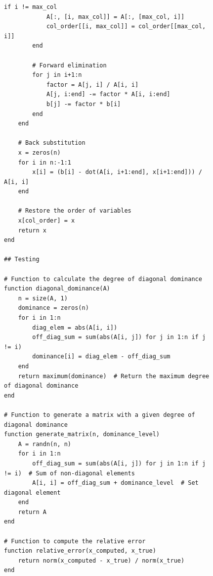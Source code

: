 \documentclass[a4paper, 14pt]{extarticle}
\begin{document}
\begin{figure}[!htb]
\begin{lstlisting}[caption={Реализация и сравнение разных вариаций метода Гаусса},label={lst:code3}]
        if i != max_col
            A[:, [i, max_col]] = A[:, [max_col, i]]
            col_order[[i, max_col]] = col_order[[max_col, i]]
        end

        # Forward elimination
        for j in i+1:n
            factor = A[j, i] / A[i, i]
            A[j, i:end] -= factor * A[i, i:end]
            b[j] -= factor * b[i]
        end
    end

    # Back substitution
    x = zeros(n)
    for i in n:-1:1
        x[i] = (b[i] - dot(A[i, i+1:end], x[i+1:end])) / A[i, i]
    end

    # Restore the order of variables
    x[col_order] = x
    return x
end

## Testing

# Function to calculate the degree of diagonal dominance
function diagonal_dominance(A)
    n = size(A, 1)
    dominance = zeros(n)
    for i in 1:n
        diag_elem = abs(A[i, i])
        off_diag_sum = sum(abs(A[i, j]) for j in 1:n if j != i)
        dominance[i] = diag_elem - off_diag_sum
    end
    return maximum(dominance)  # Return the maximum degree of diagonal dominance
end

# Function to generate a matrix with a given degree of diagonal dominance
function generate_matrix(n, dominance_level)
    A = randn(n, n)
    for i in 1:n
        off_diag_sum = sum(abs(A[i, j]) for j in 1:n if j != i)  # Sum of non-diagonal elements
        A[i, i] = off_diag_sum + dominance_level  # Set diagonal element
    end
    return A
end

# Function to compute the relative error
function relative_error(x_computed, x_true)
    return norm(x_computed - x_true) / norm(x_true)
end
\end{lstlisting}
\end{figure}
\end{document}
